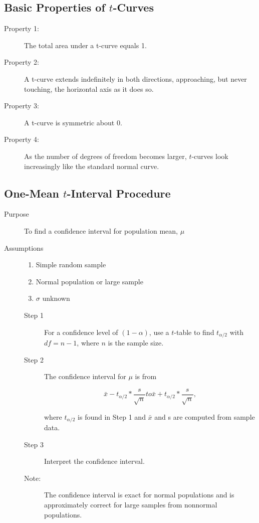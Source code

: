 \documentclass[12pt]{article}
\begin{document}
        \subsection*{Basic Properties of $t$-Curves}
            \begin{description}
                \item[Property 1:] The total area under a t-curve equals 1.
                \item[Property 2:] A t-curve extends indefinitely in both directions,
                approaching, but never touching, the horizontal axis as it does so.
                \item[Property 3:] A t-curve is symmetric about 0.
                \item[Property 4:] As the number of degrees of freedom becomes larger,
                $t$-curves look increasingly like the standard normal curve.   
            \end{description}
        \subsection*{One-Mean $t$-Interval Procedure}
            \begin{description}
                \item[Purpose] To find a confidence interval for population mean, $\mu$
                \item[Assumptions]
                \begin{enumerate}
                    \item Simple random sample
                    \item Normal population or large sample
                    \item $\sigma$ unknown                    
                \end{enumerate}  
                \begin{description}
                    \item[Step 1] For a confidence level of $(1-\alpha)$, use a $t$-table to find 
                    $t_{\alpha/2}$ with $df = n-1$, where $n$ is the sample size.
                    \item[Step 2] The confidence interval for $\mu$ is from
                    \begin{center}
                        \[
                            \bar{x} - t_{\alpha/2}*\frac{s}{\sqrt{n}} to
                            \bar{x} + t_{\alpha/2}*\frac{s}{\sqrt{n}},    
                        \]                        
                    \end{center} 
                    where $t_{\alpha/2}$ is found in Step 1 and $\bar{x}$ and s are computed from
                    sample data.
                    \item[Step 3] Interpret the confidence interval.
                    \item[Note:] The confidence interval is exact for normal populations and is 
                    approximately correct for large samples from nonnormal populations.
                \end{description}
            \end{description}
\end{document}
